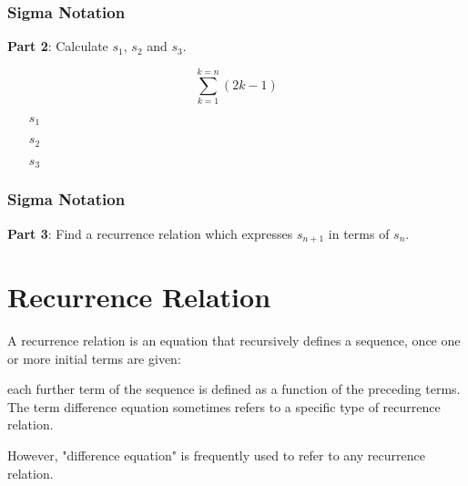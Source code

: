 \begin{frame}
	\frametitle{Sigma Notation}
	\Large
	\vspace{-2.3cm}
	\textbf{Part 2}: Calculate $s_1$, $s_2$ and $s_3$.
	
	{
		\LARGE
		\[  \sum^{k=n}_{k=1} (2k-1) \]
	}
	
	\begin{itemize}
		\item[$s_1$]
		\item[$s_2$]
		\item[$s_3$]
	\end{itemize}
	
\end{frame}
\begin{frame}
	\frametitle{Sigma Notation}
	\Large
	\vspace{-2.3cm}
	\textbf{Part 3}: Find a recurrence relation which expresses $s_{n+1}$ in terms of $s_n$.
	
	
\end{frame}
\section{Recurrence Relation}


A recurrence relation is an equation that recursively defines a sequence, once one or more initial terms are given: 

each further term of the sequence is defined as a function of the preceding terms.
The term difference equation sometimes refers to a specific type of recurrence relation. 

However, "difference equation" is frequently used to refer to any recurrence relation.




\documentclass{beamer}

\usepackage[english]{babel}

\usepackage[utf8]{inputenc}

\usepackage{times}
\usepackage[T1]{fontenc}

